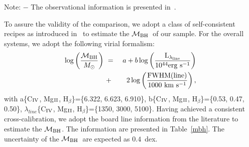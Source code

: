 \documentclass[fleqn,usenatbib]{mnras}
\newcommand{\mbh}{$\mathcal M_{\rm BH}$}
\newcommand{\Hb}{H$_{\beta}$}
\newcommand{\Mgii}{Mg$_{\rm II}$}
\newcommand{\Civ}{C$_{\rm IV}$}
\begin{document}
\begin{table}
\centering
\caption{Summary of lensed AGN information.}\label{data_set}
\begin{tablenotes}
      \small
      \item Note: $-$ The observational information is presented in~\citet{Ding2017a}.
\end{tablenotes}  
\end{table}

To assure the validity of the comparison, we adopt a class of self-consistent recipes as introduced in~\citet{Ding2020} to estimate the \mbh\ of our sample. For the overall systems, we adopt the following virial formalism:
\begin{eqnarray}
\label{recipe}
\log \left(\frac{\mathcal M_{\rm BH}}{M_{\odot}}\right)&~=~& a+b \log \left(\frac{ \rm L _{\lambda_{line}}}{10^{44}{\rm erg~s^{-1}}}\right) \nonumber\\
&~+~& 2 \log \left(\frac{\rm FWHM(line)}{1000 ~{\rm km~s^{-1}}}\right) , 
\end {eqnarray}
%
with a\{\Civ, \Mgii, \Hb\}=\{6.322, 6.623, 6.910\},
b\{\Civ, \Mgii, \Hb\}=\{0.53, 0.47, 0.50\},
$\lambda_{line}$\{\Civ, \Mgii, \Hb\}=\{1350, 3000, 5100\}.
%
Having achieved a consistent cross-calibration, we adopt the board line information from the literature \citep{Sluse2012, Peng2006, Shen2011} to estimate the \mbh. The information are presented in Table~\ref{mbh}. The uncertainty of the \mbh\ are expected as $0.4$~dex.
\end{document}
